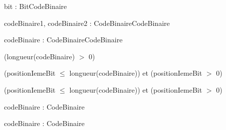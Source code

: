 \begin{algorithme}

    {bit : Bit}{CodeBinaire}

    {codeBinaire1, codeBinaire2 : CodeBinaire}{CodeBinaire}

    {}
    {}

    {codeBinaire : CodeBinaire}{CodeBinaire}

    {}
    {(longueur(codeBinaire) $>$ 0)}

    {}

    {}
    {}
    {(positionIemeBit $\leq$ longueur(codeBinaire)) et (positionIemeBit $>$ 0)}

    {}
    {}
    {(positionIemeBit $\leq$ longueur(codeBinaire)) et (positionIemeBit $>$ 0)}

    {codeBinaire : CodeBinaire}{\naturelNonNul}

    {codeBinaire : CodeBinaire}{\booleenl}

\end{algorithme}
